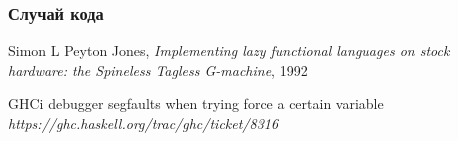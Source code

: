 \documentclass[fontsize=14pt, paper=a4, pagesize, DIV=calc]{scrartcl}
\begin{document}
\subsubsection{Случай кода}

\begin{thebibliography}{9}

Simon L Peyton Jones,
\emph{Implementing lazy functional languages on stock hardware: the Spineless
Tagless G-machine}, 1992

GHCi debugger segfaults when trying force a certain variable
\emph{https://ghc.haskell.org/trac/ghc/ticket/8316}

\end{thebibliography}
\end{document}
